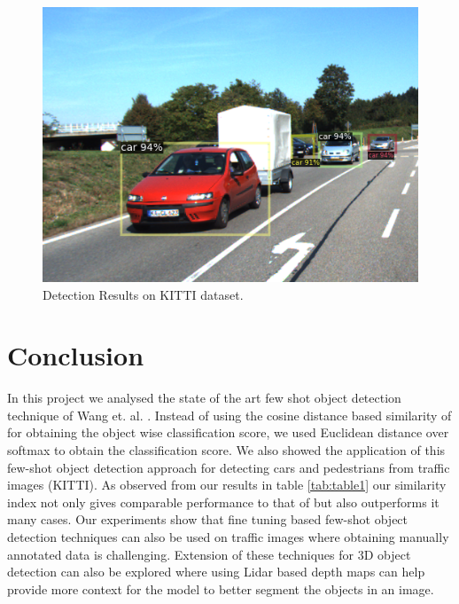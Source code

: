 \documentclass{article}
\begin{document}
\begin{figure}[h!]
\begin{minipage}{0.31\textwidth}
  \includegraphics[height=0.17\textheight, trim={3cm 0cm 0cm 0cm}, clip]{./../../final_results/Kitti/000128_10shot.png}
  \end{minipage}
  \caption{Detection Results on KITTI dataset. }
  \label{kitti_plots}
\end{figure}

\section{Conclusion}
In this project we analysed the state of the art few shot object detection technique of Wang et. al. \cite{wang2020frustratingly}. Instead of using the cosine distance based similarity of \cite{wang2020frustratingly} for obtaining the object wise classification score, we used Euclidean distance over softmax to obtain the classification score. We also showed the application of this few-shot object detection approach for detecting cars and pedestrians from traffic images (KITTI). As observed from our results in table \ref{tab:table1} our similarity index not only gives comparable performance to that of \cite{wang2020frustratingly} but also outperforms it many cases. Our experiments show that fine tuning based few-shot object detection techniques can also be used on traffic images where obtaining manually annotated data is challenging. Extension of these techniques for 3D object detection can also be explored where using Lidar based depth maps can help provide more context for the model to better segment the objects in an image.
\end{document}
